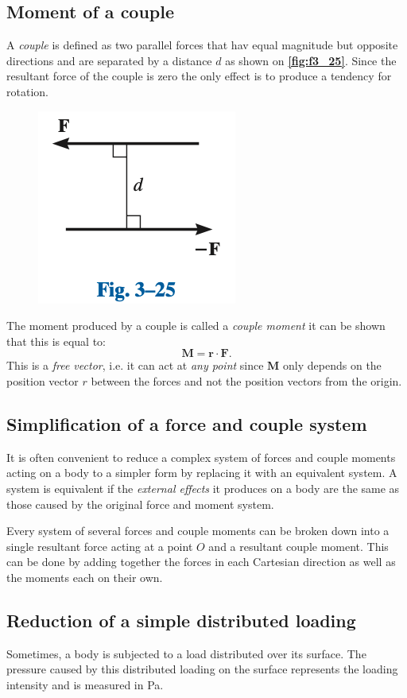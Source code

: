 
\subsection{Moment of a couple}
A \textit{couple} is defined as two parallel forces that hav equal magnitude but opposite directions and are separated by a distance $d$ as shown on \textbf{\autoref{fig:f3_25}}. Since the resultant force of the couple is zero the only effect is to produce a tendency for rotation.

\begin{figure} [ht]
  \centering
  \includegraphics[width=0.25\linewidth]{./figures/f3_25.png}
  \caption{}
  \label{fig:f3_25}
\end{figure}

The moment produced by a couple is called a \textit{couple moment} it can be shown that this is equal to:
\[ 
\textbf{M} = \textbf{r} \cdot \textbf{F}
.\]
This is a \textit{free vector}, i.e. it can act at \textit{any point} since $\textbf{M}$ only depends on the position vector $r$ between the forces and not the position vectors from the origin.


\subsection{Simplification of a force and couple system}
It is often convenient to reduce a complex system of forces and couple moments acting on a body to a simpler form by replacing it with an equivalent system. A system is equivalent if the \textit{external effects} it produces on a body are the same as those caused by the original force and moment system. 

Every system of several forces and couple moments can be broken down into a single resultant force acting at a point $O$ and a resultant couple moment. This can be done by adding together the forces in each Cartesian direction as well as the moments each on their own. 

\subsection{Reduction of a simple distributed loading}
Sometimes, a body is subjected to a load distributed over its surface. The pressure caused by this distributed loading on the surface represents the loading intensity and is measured in \unit{Pa}. 

